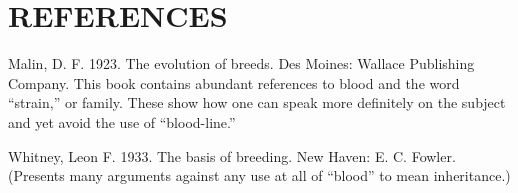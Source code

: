\newpage
\section*{REFERENCES}

\begin{hangparas}{0.5in}{1}%
\nowidow
Malin, D. F. 1923. The evolution of breeds. Des Moines: Wallace Publishing Company.
This book contains abundant references to blood and the word
``strain,'' or family. These show how one can speak more definitely on the
subject and yet avoid the use of ``blood-line.''

Whitney, Leon F. 1933. The basis of breeding. New Haven: E. C. Fowler. (Presents
many arguments against any use at all of ``blood'' to mean inheritance.)
\end{hangparas}